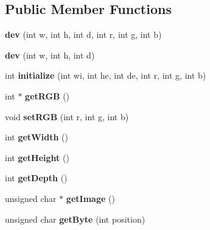 \subsection*{Public Member Functions}
\begin{DoxyCompactItemize}
\item 
\hypertarget{classdev_a1528dde7e946aea9efeb5c25ff163af9}{
{\bfseries dev} (int w, int h, int d, int r, int g, int b)}
\label{classdev_a1528dde7e946aea9efeb5c25ff163af9}

\item 
\hypertarget{classdev_adf38a65aa0df77c0c58fb7a35bf57f2e}{
{\bfseries dev} (int w, int h, int d)}
\label{classdev_adf38a65aa0df77c0c58fb7a35bf57f2e}

\item 
\hypertarget{classdev_aea51d02a9f5c04fdacc63b415d7fba6f}{
int {\bfseries initialize} (int wi, int he, int de, int r, int g, int b)}
\label{classdev_aea51d02a9f5c04fdacc63b415d7fba6f}

\item 
\hypertarget{classdev_affbd3c6d38407a67260b0805a2a996ba}{
int $\ast$ {\bfseries getRGB} ()}
\label{classdev_affbd3c6d38407a67260b0805a2a996ba}

\item 
\hypertarget{classdev_aae6a7a4192d0bf1090456d8fa5d27a09}{
void {\bfseries setRGB} (int r, int g, int b)}
\label{classdev_aae6a7a4192d0bf1090456d8fa5d27a09}

\item 
\hypertarget{classdev_adc3b057042e6069d8e2432c48418c173}{
int {\bfseries getWidth} ()}
\label{classdev_adc3b057042e6069d8e2432c48418c173}

\item 
\hypertarget{classdev_a760161504ea05e090293aff31c834634}{
int {\bfseries getHeight} ()}
\label{classdev_a760161504ea05e090293aff31c834634}

\item 
\hypertarget{classdev_a676db2fb79a8b6ddf21527aafa44ddab}{
int {\bfseries getDepth} ()}
\label{classdev_a676db2fb79a8b6ddf21527aafa44ddab}

\item 
\hypertarget{classdev_accda40f66947d00bc9fd294f47a187f6}{
unsigned char $\ast$ {\bfseries getImage} ()}
\label{classdev_accda40f66947d00bc9fd294f47a187f6}

\item 
\hypertarget{classdev_a220ca2f10395d25b828e9d5e72feefb7}{
unsigned char {\bfseries getByte} (int position)}
\label{classdev_a220ca2f10395d25b828e9d5e72feefb7}

\end{DoxyCompactItemize}
